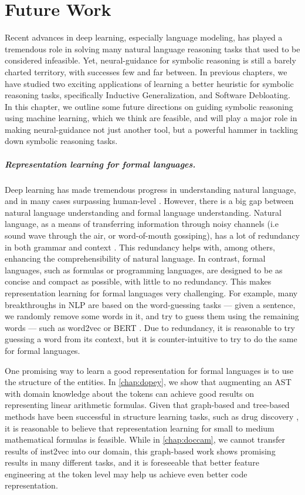 \chapter{Future Work}
\label{chap:future}
Recent advances in deep learning, especially language modeling, has played a tremendous role in solving many natural language reasoning tasks that used to be considered infeasible. Yet, neural-guidance for symbolic reasoning is still a barely charted territory, with successes few and far between.
In previous chapters, we have studied two exciting applications of learning a better heuristic for symbolic reasoning tasks, specifically Inductive Generalization, and Software Debloating.
In this chapter, we outline some future directions on guiding symbolic reasoning using machine learning, which we think are feasible, and will play a major role in making neural-guidance not just another tool, but a powerful hammer in tackling down symbolic reasoning tasks.

\paragraph{Representation learning for formal languages.} Deep learning has made tremendous progress in understanding natural language, and in many cases surpassing human-level \cite{whosaidwhat, whosaidwhat2}. However, there is a big gap between natural language understanding and formal language understanding. Natural language, as a means of transferring information through noisy channels (i.e sound wave through the air, or word-of-mouth gossiping), has a lot of redundancy in both grammar and context \cite{ling_redundancy}. This redundancy helps with, among others, enhancing the comprehensibility of natural language. In contrast, formal languages, such as formulas or programming languages, are designed to be as concise and compact as possible, with little to no redundancy. This makes representation learning for formal languages very challenging. For example, many breakthroughs in NLP are based on the word-guessing tasks --- given a sentence, we randomly remove some words in it, and try to guess them using the remaining words --- such as word2vec \cite{word2vec} or BERT \cite{bert}. Due to redundancy, it is reasonable to try guessing a word from its context, but it is counter-intuitive to try to do the same for formal languages. 

One promising way to learn a good representation for formal languages is to use the structure of the entities. In \cref{chap:dopey}, we show that augmenting an AST with domain knowledge about the tokens can achieve good results on representing linear arithmetic formulas. Given that graph-based and tree-based methods have been successful in structure learning tasks, such as drug discovery \cite{drug_dis}, it is reasonable to believe that representation learning for small to medium mathematical formulas is feasible. While in \cref{chap:doccam}, we cannot transfer results of inst2vec \cite{inst2vec} into our domain, this graph-based work shows promising results in many different tasks, and it is foreseeable that better feature engineering at the token level may help us achieve even better code representation.


